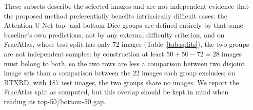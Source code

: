 These subsets describe the selected images and are not independent evidence that the proposed method preferentially benefits intrinsically difficult cases: the Attention U-Net top- and bottom-Dice groups are defined entirely by that same baseline's own predictions, not by any external difficulty criterion, and on FracAtlas, whose test split has only 72 images (Table~\ref{tab:splits}), the two groups are not independent samples: by construction at least $50+50-72=28$ images must belong to both, so the two rows are less a comparison between two disjoint image sets than a comparison between the 22 images each group excludes; on BTXRD, with 187 test images, the two groups share no images. We report the FracAtlas split as computed, but this overlap should be kept in mind when reading its top-50/bottom-50 gap.

\begin{table}[t]
\caption{Top-Dice and bottom-Dice subsets at $512\times512$, 50 images per group, covering prompts. Groups are defined by plain Attention U-Net.}
\label{tab:extreme}
\centering
\scriptsize
{}
\end{table}

